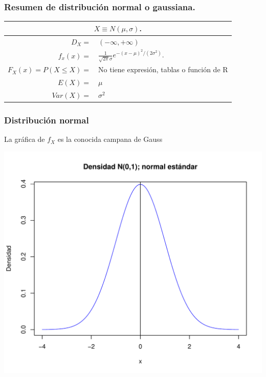 \documentclass[handout]{beamer}\usepackage[]{graphicx}\usepackage[]{color}
\makeatletter
\def\maxwidth{ %
  \ifdim\Gin@nat@width>\linewidth
    \linewidth
  \else
    \Gin@nat@width
  \fi
}
\newenvironment{knitrout}{}{} %
\renewcommand{\emph}[1]{{\color{red}#1}}
\renewcommand{\leq}{\leqslant}
\theoremstyle{plain}
\theoremstyle{definition}
\makeatother
\begin{document}
\begin{frame}
\frametitle{Resumen de distribución normal o gaussiana.}
\vspace*{-2ex}
\scriptsize
\setlength{\tabcolsep}{2pt}
\begin{table}
\centering
\begin{tabular}{|rl|}
\hline 
\multicolumn{2}{|c|}{$X\equiv N(\mu,\sigma)$.}\\ 
\hline
\hline 
$D_X=$&  $(-\infty,+\infty)$ \\\hline 
$f_x(x)=$& 
$\frac{1}{\sqrt{2\pi}\sigma} e^{{-(x-\mu)^2}/{(2\sigma^{2})}}.$\\ \hline 
$F_X(x)=P(X\leq X)=$ &  No tiene expresión, tablas o función de R\\
\hline 
$E(X)=$ & $\mu$\\
$Var(X)=$ & $\sigma^2$\\
\hline
\end{tabular}
\end{table}
\normalsize
\end{frame}




\begin{frame} 
\frametitle{Distribución normal}
La gráfica de $f_X$ es la conocida \emph{campana de Gauss}


\begin{knitrout}
\color{fgcolor}
\includegraphics[width=\maxwidth]{figure/unnamed-chunk-1-1} 

\end{knitrout}




\end{frame}
\end{document}
